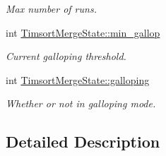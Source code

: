 \begin{DoxyCompactItemize}
\begin{DoxyCompactList}\small\item\em Max number of runs. \end{DoxyCompactList}\item 
\mbox{\label{group__SimpleSorts_ga382c0762f06c680bb4fec455f8823bf1}} 
int \hyperlink{group__SimpleSorts_ga382c0762f06c680bb4fec455f8823bf1}{Timsort\+Merge\+State\+::min\+\_\+gallop}
\begin{DoxyCompactList}\small\item\em Current galloping threshold. \end{DoxyCompactList}\item 
\mbox{\label{group__SimpleSorts_gab45c7800608ba6dd2b3d7f7b68bafb68}} 
int \hyperlink{group__SimpleSorts_gab45c7800608ba6dd2b3d7f7b68bafb68}{Timsort\+Merge\+State\+::galloping}
\begin{DoxyCompactList}\small\item\em Whether or not in galloping mode. \end{DoxyCompactList}\end{DoxyCompactItemize}


\subsection{Detailed Description}
